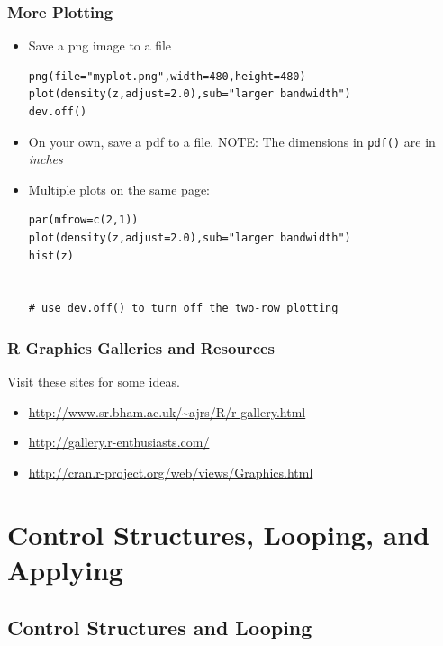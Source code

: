 \documentclass[]{article}
\theoremstyle{definition}
\theoremstyle{definition}
\theoremstyle{remark}
\begin{document}
\subsubsection{More Plotting}\label{more-plotting-2}

\begin{itemize}
\item
  {Save a png image to a file}

\begin{verbatim}
png(file="myplot.png",width=480,height=480)
plot(density(z,adjust=2.0),sub="larger bandwidth")
dev.off()
\end{verbatim}
\item
  {On your own, save a pdf to a file. NOTE: The dimensions in
  \texttt{pdf()} are in \emph{inches}}
\item
  {Multiple plots on the same page:}

\begin{verbatim}
par(mfrow=c(2,1))
plot(density(z,adjust=2.0),sub="larger bandwidth")
hist(z)


# use dev.off() to turn off the two-row plotting
\end{verbatim}
\end{itemize}

\subsubsection{R Graphics Galleries and
Resources}\label{r-graphics-galleries-and-resources}

Visit these sites for some ideas.

\begin{itemize}
\item
  {\url{http://www.sr.bham.ac.uk/~ajrs/R/r-gallery.html}}
\item
  {\url{http://gallery.r-enthusiasts.com/}}
\item
  {\url{http://cran.r-project.org/web/views/Graphics.html}}
\end{itemize}

\section{Control Structures, Looping, and
Applying}\label{control-structures-looping-and-applying}

\subsection{Control Structures and
Looping}\label{control-structures-and-looping}
\end{document}
